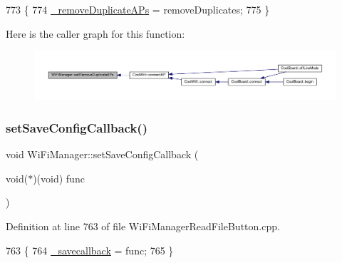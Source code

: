 \begin{DoxyCode}
773                                                                 \{
774   \hyperlink{class_wi_fi_manager_a94d25bd8d02bbf0236d75dfd8ee682d7}{\_removeDuplicateAPs} = removeDuplicates;
775 \}
\end{DoxyCode}
Here is the caller graph for this function\+:\nopagebreak
\begin{figure}[H]
\begin{center}
\leavevmode
\includegraphics[width=350pt]{d4/dc8/class_wi_fi_manager_a4dd1dbf4f22900f226a3897b88155212_icgraph}
\end{center}
\end{figure}
\mbox{\label{class_wi_fi_manager_a3666ca145de5e28d943db54fcb204e65}} 
\subsubsection{\texorpdfstring{set\+Save\+Config\+Callback()}{setSaveConfigCallback()}}
{\footnotesize\ttfamily void Wi\+Fi\+Manager\+::set\+Save\+Config\+Callback (\begin{DoxyParamCaption}\item[{void($\ast$)(void)}]{func }\end{DoxyParamCaption})}



Definition at line 763 of file Wi\+Fi\+Manager\+Read\+File\+Button.\+cpp.


\begin{DoxyCode}
763                                                             \{
764   \hyperlink{class_wi_fi_manager_a9a316060184788e33e71d88101cb2e0d}{\_savecallback} = func;
765 \}
\end{DoxyCode}
\mbox{\label{class_wi_fi_manager_a124d89536d0ba5b5bd117e6c44a53e8d}} 
